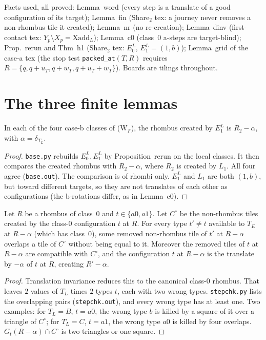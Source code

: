 \documentclass[11pt]{article}
\begin{document}
Facts used, all proved:
Lemma~word (every step is a translate of a good configuration of its target);
Lemma~fin (Share$_2$ tex: a journey never removes a non-rhombus tile it created);
Lemma~nr (no re-creation);
Lemma~dinv (first-contact tex: $Y_p\setminus X_p=\mathrm{Xadd}_L$);
Lemma~c0 (class~0 a-steps are target-blind);
Prop.~rerun and Thm~h1 (Share$_2$ tex: $E^L_0$, $E^L_1=(1,b)$);
Lemma~grid of the case-a tex (the stop test \texttt{packed\_at}$(T,R)$ requires $R=\{q,q+u_T,q+w_T,q+u_T+w_T\}$).
Boards are tilings throughout.

\section{The three finite lemmas}
\begin{lemma}\label{lem:base}
In each of the four case-b classes of (W$_F$), the rhombus created by $E^L_1$ is $R_2-\alpha$, with $\alpha=\delta_{T_L}$.
\end{lemma}
\begin{proof}
\texttt{base.py} rebuilds $E^L_0,E^L_1$ by Proposition~rerun on the local classes. It then compares the created rhombus with $R_2-\alpha$, where $R_2$ is created by $L_1$. All four agree (\texttt{base.out}). The comparison is of rhombi only. $E^L_1$ and $L_1$ are both $(1,b)$, but toward different targets, so they are not translates of each other as configurations (the b-rotations differ, as in Lemma~c0).
\end{proof}

\begin{lemma}\label{lem:step}
Let $R$ be a rhombus of class~0 and $t\in\{a0,a1\}$. Let $C^\circ$ be the non-rhombus tiles created by the class-0 configuration $t$ at $R$. For every type $t'\neq t$ available to $T_E$ at $R-\alpha$ (which has class~0), some removed non-rhombus tile of $t'$ at $R-\alpha$ overlaps a tile of $C^\circ$ without being equal to it. Moreover the removed tiles of $t$ at $R-\alpha$ are compatible with $C^\circ$, and the configuration $t$ at $R-\alpha$ is the translate by $-\alpha$ of $t$ at $R$, creating $R'-\alpha$.
\end{lemma}
\begin{proof}
Translation invariance reduces this to the canonical class-0 rhombus. That leaves $2$ values of $T_L$ times $2$ types $t$, each with two wrong types. \texttt{stepchk.py} lists the overlapping pairs (\texttt{stepchk.out}), and every wrong type has at least one. Two examples: for $T_L=B$, $t=a0$, the wrong type $b$ is killed by a square of it over a triangle of $C^\circ$; for $T_L=C$, $t=a1$, the wrong type $a0$ is killed by four overlaps. $G_t(R-\alpha)\cap C^\circ$ is two triangles or one square.
\end{proof}
\end{document}
